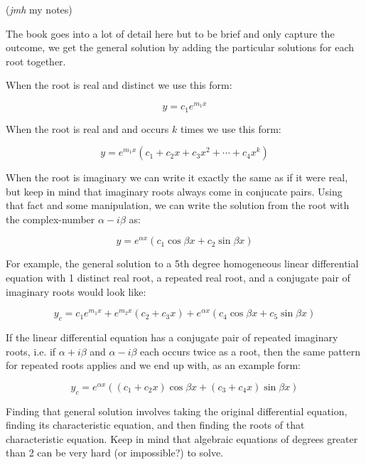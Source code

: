 \documentclass{article}
\begin{document}
(\emph{jmh} my notes)

The book goes into a lot of detail here but to be brief and only capture the outcome, we get the general solution by adding the particular solutions for each root together.

When the root is real and distinct we use this form:

\[ y = c_1 e^{m_1 x} \]

When the root is real and and occurs $k$ times we use this form:

\[ y = e^{m_1 x} (c_1 + c_2 x + c_3x^2 + \cdots + c_4x^k) \]

When the root is imaginary we can write it exactly the same as if it were real, but keep in mind that imaginary roots always come in conjucate pairs. Using that fact and some manipulation, we can write the solution from the root with the \@{complex-number} $\alpha - i\beta$ as:

\[ y = e^{\alpha x}(c_1\cos\beta x + c_2\sin\beta x) \]

For example, the general solution to a 5th degree homogeneous linear differential equation with 1 distinct real root, a repeated real root, and a conjugate pair of imaginary roots would look like:

\[ y_c = c_1 e^{m_1 x} + e^{m_2 x}(c_2 + c_3x) + e^{\alpha x}(c_4\cos\beta x + c_5\sin\beta x) \]

If the linear differential equation has a conjugate pair of repeated imaginary roots, i.e. if $\alpha + i \beta$ and $\alpha - i \beta$ each occurs twice as a root, then the same pattern for repeated roots applies and we end up with, as an example form:

\[ y_c = e^{\alpha x} ((c_1 + c_2 x) \cos{\beta x} + (c_3 + c_4 x) \sin{\beta x}) \]

Finding that general solution involves taking the original differential equation, finding its characteristic equation, and then finding the roots of that characteristic equation. Keep in mind that algebraic equations of degrees greater than 2 can be very hard (or impossible?) to solve.
\end{document}
